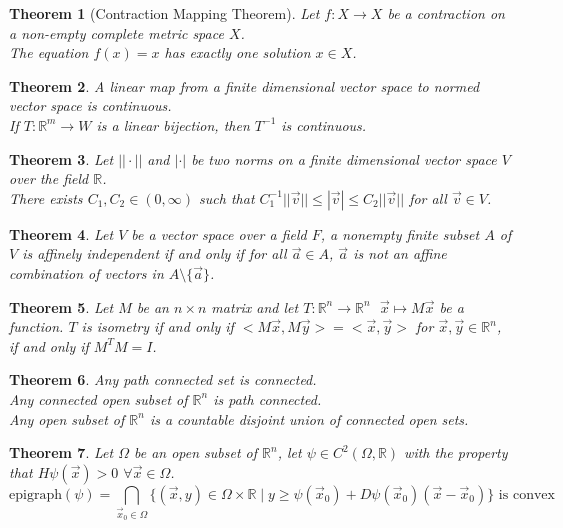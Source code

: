 \documentclass[11pt]{article}
\theoremstyle{break}
\theoremstyle{break}
\newtheorem{thm}{Theorem}[section]
\newcommand{\R}{\mathbb{R}}
\begin{document}
\begin{thm}[Contraction Mapping Theorem]
Let $f:X \to X$ be a contraction on a non-empty complete metric space $X$.\\ The equation $f(x) = x$ has exactly one solution $x \in X$.  
\end{thm}

\begin{thm}
A linear map from a finite dimensional vector space to normed vector space is continuous.\\
If $T:\R^m \to W$ is a linear bijection, then $T^{-1}$ is continuous.  
\end{thm}

\begin{thm}
Let $||\cdot ||$ and $|\cdot |$ be two norms on a finite dimensional vector space $V$ over the field $\R$.\\ There exists $C_1,C_2 \in (0,\infty)$ such that $C_1^{-1} ||\vec{v}|| \leq |\vec{v}| \leq C_2 ||\vec{v}||$ for all $\vec{v}\in V$. 
\end{thm}

\begin{thm}
Let $V$ be a vector space over a field $F$, a nonempty finite subset $A$ of $V$ is affinely independent if and only if for all $\vec{a}\in A$, $\vec{a}$ is not an affine combination of vectors in $A \setminus \{\vec{a}\}$.  
\end{thm}

\begin{thm}
Let $M$ be an $n \times n$ matrix and let $T:\R^n \to \R^n\ \ \ \vec{x}\mapsto M\vec{x}$ be a function. $T$ is isometry if and only if $<M\vec{x},M\vec{y}> = <\vec{x},\vec{y}>$ for $\vec{x},\vec{y}\in \R^n$, if and only if $M^TM = I$. 
\end{thm}

\begin{thm}
Any path connected set is connected.\\
Any connected open subset of $\R^n$ is path connected.\\
Any open subset of $\R^n$ is a countable disjoint union of connected open sets.
\end{thm}

\begin{thm}
Let $\Omega$ be an open subset of $\R^n$, let $\psi \in C^2(\Omega, \R)$ with the property that $H\psi(\vec{x})> 0$ $\forall \vec{x}\in \Omega$.
$$\text{epigraph}(\psi) = \bigcap_{\vec{x}_0 \in \Omega} \{ (\vec{x},y) \in \Omega \times \R \mid y\geq \psi(\vec{x}_0)+D\psi (\vec{x}_0) (\vec{x}-\vec{x}_0)\}\text{ is convex}$$
\end{thm}
\end{document}
